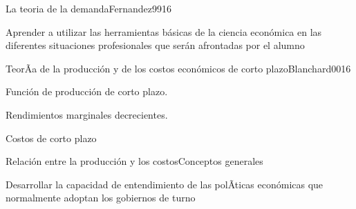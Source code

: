 \begin{syllabus}
\begin{unit}{La teoria de la demanda}{Fernandez99}{16}
\begin{unitgoals}
      \item Aprender a utilizar las herramientas básicas de la ciencia económica en las diferentes situaciones profesionales que serán afrontadas por el alumno
   \end{unitgoals}
\end{unit}


\begin{unit}{TeorÃ­a de la producción y de los costos económicos de corto plazo}{Blanchard00}{16}
\begin{topics}
	\item Función de producción de corto plazo.
	\item Rendimientos marginales decrecientes.
	\item Costos de corto plazo
	\item Relación entre la producción y los costosConceptos generales
\end{topics}

\begin{unitgoals}
      \item Desarrollar la capacidad de entendimiento de las polÃ­ticas económicas que normalmente adoptan los gobiernos de turno
   \end{unitgoals}
\end{unit}

\begin{coursebibliography}
\end{coursebibliography}
\end{syllabus}





